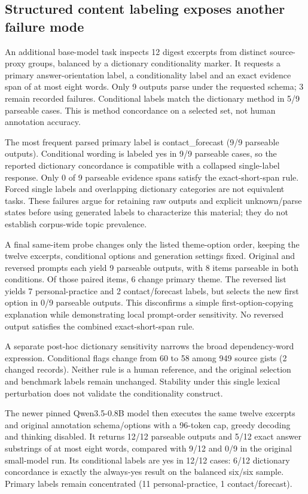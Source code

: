 \subsection{Structured content labeling exposes another failure mode}

An additional base-model task inspects 12 digest excerpts from distinct source-proxy groups, balanced by a dictionary conditionality marker. It requests a primary answer-orientation label, a conditionality label and an exact evidence span of at most eight words. Only 9 outputs parse under the requested schema; 3 remain recorded failures. Conditional labels match the dictionary method in 5/9 parseable cases. This is method concordance on a selected set, not human annotation accuracy.

The most frequent parsed primary label is contact\_forecast (9/9 parseable outputs). Conditional wording is labeled yes in 9/9 parseable cases, so the reported dictionary concordance is compatible with a collapsed single-label response. Only 0 of 9 parseable evidence spans satisfy the exact-short-span rule. Forced single labels and overlapping dictionary categories are not equivalent tasks. These failures argue for retaining raw outputs and explicit unknown/parse states before using generated labels to characterize this material; they do not establish corpus-wide topic prevalence.

A final same-item probe changes only the listed theme-option order, keeping the twelve excerpts, conditional options and generation settings fixed. Original and reversed prompts each yield 9 parseable outputs, with 8 items parseable in both conditions. Of those paired items, 6 change primary theme. The reversed list yields 7 personal-practice and 2 contact/forecast labels, but selects the new first option in 0/9 parseable outputs. This disconfirms a simple first-option-copying explanation while demonstrating local prompt-order sensitivity. No reversed output satisfies the combined exact-short-span rule.

A separate post-hoc dictionary sensitivity narrows the broad dependency-word expression. Conditional flags change from 60 to 58 among 949 source gists (2 changed records). Neither rule is a human reference, and the original selection and benchmark labels remain unchanged. Stability under this single lexical perturbation does not validate the conditionality construct.

The newer pinned Qwen3.5-0.8B model then executes the same twelve excerpts and original annotation schema/options with a 96-token cap, greedy decoding and thinking disabled. It returns 12/12 parseable outputs and 5/12 exact answer substrings of at most eight words, compared with 9/12 and 0/9 in the original small-model run. Its conditional labels are yes in 12/12 cases: 6/12 dictionary concordance is exactly the always-yes result on the balanced six/six sample. Primary labels remain concentrated (11 personal-practice, 1 contact/forecast).

